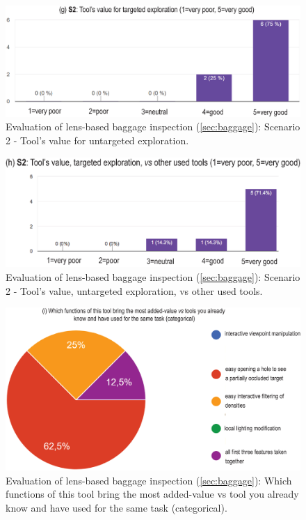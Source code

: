 \begin{figure}
\centering
\includegraphics [width=\textwidth]{images/graph7.eps}
\caption{Evaluation of lens-based baggage inspection (\autoref{sec:baggage}): Scenario 2 - Tool's value for untargeted exploration.}
\label{fig:graph7}
\end{figure}

\begin{figure}
\centering
\includegraphics [width=\textwidth]{images/graph8.eps}
\caption{Evaluation of lens-based baggage inspection (\autoref{sec:baggage}): Scenario 2 - Tool's value, untargeted exploration, vs other used tools.}
\label{fig:graph8}
\end{figure}


\begin{figure}
\centering
\includegraphics [width=\textwidth]{images/graph9.eps}
\caption{Evaluation of lens-based baggage inspection (\autoref{sec:baggage}): Which functions of this tool bring the most added-value vs tool you already know and have used for the same task (categorical).}
\label{fig:graph9}
\end{figure}


